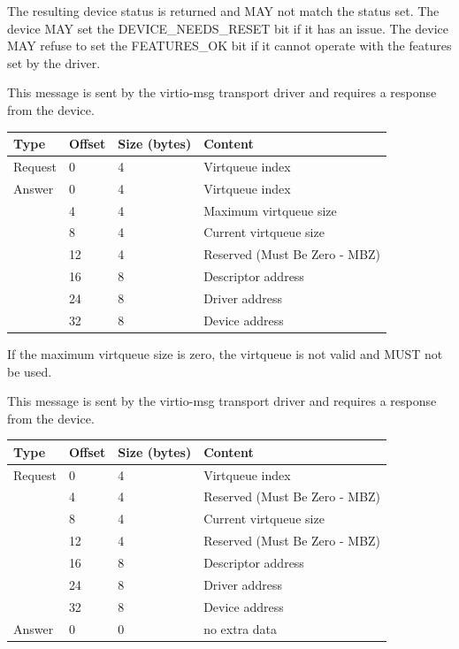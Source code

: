 The resulting device status is returned and MAY not match the status set.  The
device MAY set the DEVICE_NEEDS_RESET bit if it has an issue.  The device MAY
refuse to set the FEATURES_OK bit if it cannot operate with the features set
by the driver.


This message is sent by the virtio-msg transport driver and requires a
response from the device.

\begin{tabular}{|l|l|l|l|}
\hline
Type & Offset & Size (bytes) & Content \\
\hline \hline
Request & 0 & 4 & Virtqueue index \\
\hline
Answer & 0 & 4 & Virtqueue index \\
& 4 & 4 & Maximum virtqueue size \\
& 8 & 4 & Current virtqueue size \\
& 12 & 4 & Reserved (Must Be Zero - MBZ) \\
& 16 & 8 & Descriptor address \\
& 24 & 8 & Driver address \\
& 32 & 8 & Device address \\
\hline
\end{tabular}

If the maximum virtqueue size is zero, the virtqueue is not valid and
MUST not be used.


This message is sent by the virtio-msg transport driver and requires a
response from the device.

\begin{tabular}{|l|l|l|l|}
\hline
Type & Offset & Size (bytes) & Content \\
\hline \hline
Request & 0 & 4 & Virtqueue index \\
& 4 & 4 & Reserved (Must Be Zero - MBZ) \\
& 8 & 4 & Current virtqueue size \\
& 12 & 4 & Reserved (Must Be Zero - MBZ) \\
& 16 & 8 & Descriptor address \\
& 24 & 8 & Driver address \\
& 32 & 8 & Device address \\
\hline
Answer & 0 & 0 & no extra data \\
\hline
\end{tabular}


